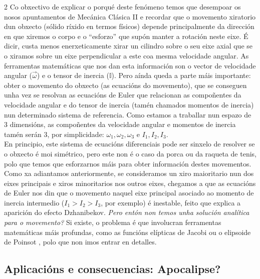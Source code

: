 \begin{multicols}{2}
Co obxectivo de explicar o porqué deste fenómeno temos que desempoar os nosos
apuntamentos de Mecánica Clásica II e recordar que o movemento xiratorio dun
obxecto (sólido ríxido en termos físicos) depende principalmente da dirección
en que xiremos o corpo e o ``esforzo'' que supón manter a rotación neste eixe.
É dicir, custa menos enerxeticamente xirar un cilindro sobre o seu eixe axial
que se o xiramos sobre un eixe perpendicular a este coa mesma velocidade
angular. As ferramentas matemáticas que nos dan esta información son o vector
de velocidade angular ($\vec{\omega}$) e o tensor de inercia ($\mathbb{I}$).
Pero aínda queda a parte máis importante: obter o movemento do obxecto (as
ecuacións do movemento), que se conseguen unha vez se resolvan as ecuacións de
Euler que relacionan as compoñentes da velocidade angular e do tensor de
inercia (tamén chamados momentos de inercia) nun determinado sistema de
referencia. Como estamos a traballar nun espazo de 3 dimensións, as compoñentes
da velocidade angular e momentos de inercia tamén serán 3, por simplicidade:
$\omega_1, \omega_2, \omega_3$ e $I_1, I_2, I_3$.\\

En principio, este sistema de ecuacións diferenciais pode ser sinxelo de
resolver se o obxecto é moi simétrico, pero este non é o caso da porca ou da
raqueta de tenis, polo que temos que esforzarnos máis para obter información
destes movementos. Como xa adiantamos anteriormente, se consideramos un xiro
maioritario nun dos eixes principais e xiros minoritarios nos outros eixes,
chegamos a que as ecuacións de Euler nos din que o movemento naquel eixe
principal asociado ao momento de inercia intermedio ($I_1>I_2>I_3$, por
exemplo) é inestable, feito que explica a aparición do efecto Dzhanibekov.
\textit{Pero entón non temos unha solución analítica para o movemento?} Si
existe, o problema é que involucran ferramentas matemáticas máis profundas,
como as funcións elípticas de Jacobi \cite{RouthDynamics} ou o elipsoide de
Poinsot \cite{VanDamme2017}, polo que non imos entrar en detalles.

\subsection*{Aplicacións e consecuencias: Apocalipse?}


\end{multicols}
